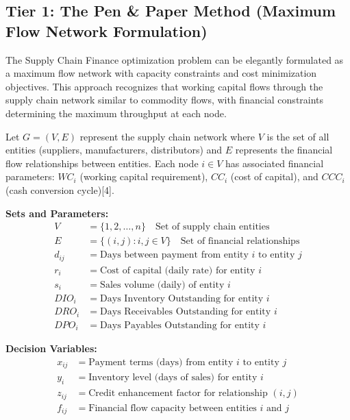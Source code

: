 \documentclass{article}
\begin{document}
\subsection{Tier 1: The Pen \& Paper Method (Maximum Flow Network Formulation)}

The Supply Chain Finance optimization problem can be elegantly formulated as a maximum flow network with capacity constraints and cost minimization objectives. This approach recognizes that working capital flows through the supply chain network similar to commodity flows, with financial constraints determining the maximum throughput at each node.

Let \( G = (V, E) \) represent the supply chain network where \( V \) is the set of all entities (suppliers, manufacturers, distributors) and \( E \) represents the financial flow relationships between entities. Each node \( i \in V \) has associated financial parameters: \( WC_i \) (working capital requirement), \( CC_i \) (cost of capital), and \( CCC_i \) (cash conversion cycle)[4].

\textbf{Sets and Parameters:}
\begin{align}
V &= \{1, 2, \ldots, n\} \quad \text{Set of supply chain entities} \\
E &= \{(i,j) : i, j \in V\} \quad \text{Set of financial relationships} \\
d_{ij} &= \text{Days between payment from entity } i \text{ to entity } j \\
r_i &= \text{Cost of capital (daily rate) for entity } i \\
s_i &= \text{Sales volume (daily) of entity } i \\
DIO_i &= \text{Days Inventory Outstanding for entity } i \\
DRO_i &= \text{Days Receivables Outstanding for entity } i \\
DPO_i &= \text{Days Payables Outstanding for entity } i
\end{align}

\textbf{Decision Variables:}
\begin{align}
x_{ij} &= \text{Payment terms (days) from entity } i \text{ to entity } j \\
y_i &= \text{Inventory level (days of sales) for entity } i \\
z_{ij} &= \text{Credit enhancement factor for relationship } (i,j) \\
f_{ij} &= \text{Financial flow capacity between entities } i \text{ and } j
\end{align}
\end{document}
